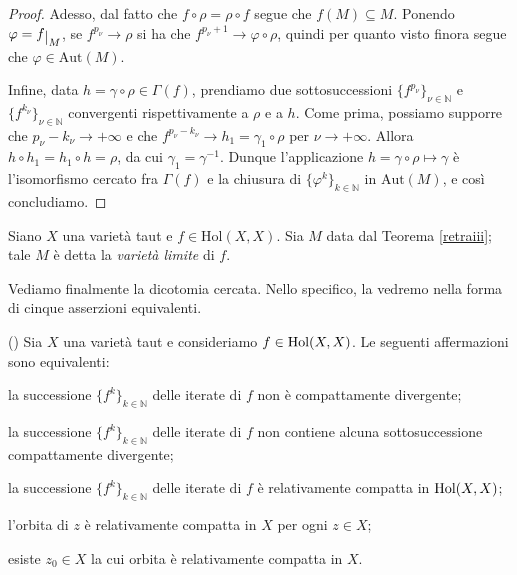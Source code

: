\begin{proof}
    Adesso, dal fatto che $f\circ\rho=\rho\circ f$ segue che $f(M)\subseteq M$. Ponendo $\varphi=f\restrict{M}$, se $f^{p_\nu}\longrightarrow\rho$ si ha che $f^{p_\nu+1}\longrightarrow\varphi\circ\rho$, quindi per quanto visto finora segue che $\varphi\in\text{Aut}(M)$.

    Infine, data $h=\gamma\circ\rho\in\Gamma(f)$, prendiamo due sottosuccessioni $\{f^{p_\nu}\}_{\nu\in\mathbb{N}}$ e $\{f^{k_\nu}\}_{\nu\in\mathbb{N}}$ convergenti rispettivamente a $\rho$ e a $h$. Come prima, possiamo supporre che $p_\nu-k_\nu \longrightarrow+\infty$ e che $f^{p_\nu-k_\nu} \longrightarrow h_1=\gamma_1\circ\rho$ per $\nu\longrightarrow+\infty$. Allora $h\circ h_1=h_1\circ h=\rho$, da cui $\gamma_1=\gamma^{-1}$. Dunque l'applicazione $h=\gamma\circ\rho\longmapsto\gamma$ è l'isomorfismo cercato fra $\Gamma(f)$ e la chiusura di $\{\varphi^k\}_{k\in\mathbb{N}}$ in $\text{Aut}(M)$, e così concludiamo.
\end{proof}

\begin{defn}
    Siano $X$ una varietà taut e $f\in\text{Hol}(X,X)$. Sia $M$ data dal Teorema \ref{retraiii}; tale $M$ è detta la \textit{varietà limite} di $f$.
\end{defn}

Vediamo finalmente la dicotomia cercata. Nello specifico, la vedremo nella forma di cinque asserzioni equivalenti.

\begin{thm} \label{dicotomia}
    (\cite[Theorem 1.1]{A2}) Sia $X$ una varietà taut e consideriamo $f \in \textnormal{Hol}(X,X)$. Le seguenti affermazioni sono equivalenti:
    \begin{nlist}
        \item la successione $\{f^k\}_{k \in \mathbb{N}}$ delle iterate di $f$ non è compattamente divergente;
        \item la successione $\{f^k\}_{k \in \mathbb{N}}$ delle iterate di $f$ non contiene alcuna sottosuccessione compattamente divergente;
        \item la successione $\{f^k\}_{k \in \mathbb{N}}$ delle iterate di $f$ è relativamente compatta in $\textnormal{Hol}(X,X)$;
        \item l'orbita di $z$ è relativamente compatta in $X$ per ogni $z \in X$;
        \item esiste $z_0 \in X$ la cui orbita è relativamente compatta in $X$.
    \end{nlist}
\end{thm}

